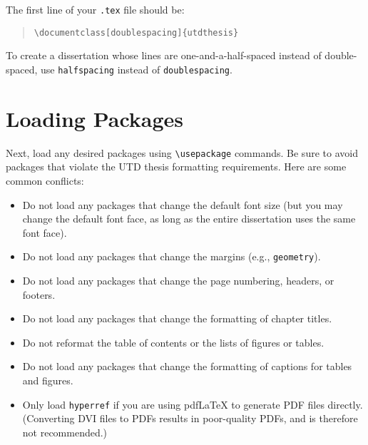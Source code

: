 \documentclass[doublespacing]{utdthesis}
\newenvironment{exampleclasscode}
 {\parindent=1cm\begin{verse}}
 {\end{verse}}
\begin{document}
The first line of your \texttt{.tex} file should be:
\begin{exampleclasscode}
\verb|\documentclass[doublespacing]{utdthesis}|
\end{exampleclasscode}
To create a dissertation whose lines are one-and-a-half-spaced instead of
double-spaced, use \texttt{halfspacing} instead of \texttt{doublespacing}.

\section{Loading Packages}
\label{s:packages}

Next, load any desired packages using \verb|\usepackage| commands.
Be sure to avoid packages that violate the UTD thesis formatting requirements.
Here are some common conflicts:
\begin{itemize}
\item Do not load any packages that change the default font size
 (but you may change the default font face, as long as the entire dissertation
 uses the same font face).
\item Do not load any packages that change the margins
 (e.g., \texttt{geometry}).
\item Do not load any packages that change the page numbering, headers,
 or footers.
\item Do not load any packages that change the formatting of chapter titles.
\item Do not reformat the table of contents or the lists of figures or tables.
\item Do not load any packages that change the formatting of captions for
 tables and figures.
\item Only load \texttt{hyperref} if you are using pdf\LaTeX{} to generate PDF
 files directly.
 (Converting DVI files to PDFs results in poor-quality PDFs, and is therefore
 not recommended.)

\end{itemize}
\end{document}
